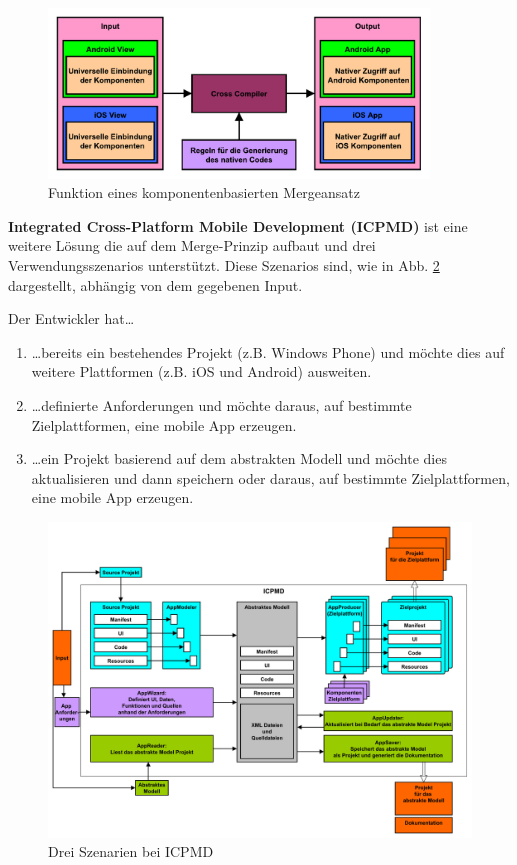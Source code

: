 \begin{figure}[htbp]
	\centering
	\includegraphics[width=0.9\textwidth]{Bilder/Merge_Component_based}
	\caption{Funktion eines komponentenbasierten Mergeansatz}\label{graph_merge_component_based}
\end{figure}

\medskip
\textbf{Integrated Cross-Platform Mobile Development (ICPMD)} ist eine weitere Lösung die auf dem Merge-Prinzip aufbaut und drei Verwendungsszenarios unterstützt. Diese Szenarios sind, wie in Abb. \ref{graph_merge_integrated_based} dargestellt, abhängig von dem gegebenen Input.

\medskip 
Der Entwickler hat…
 
\begin{enumerate}
	\item …bereits ein bestehendes Projekt (z.B. Windows Phone) und möchte dies auf weitere Plattformen (z.B. iOS und Android) ausweiten.
	
	\item …definierte Anforderungen und möchte daraus, auf bestimmte Zielplattformen, eine mobile App erzeugen.
	
	\item …ein Projekt basierend auf dem abstrakten Modell und möchte dies aktualisieren und dann speichern oder daraus, auf bestimmte Zielplattformen, eine mobile App erzeugen.
\end{enumerate}

\begin{figure}[htbp]
	\centering
	\includegraphics[width=1\textwidth]{Bilder/Merge_Integrated_based}
	\caption{Drei Szenarien bei ICPMD}\label{graph_merge_integrated_based}
\end{figure}

